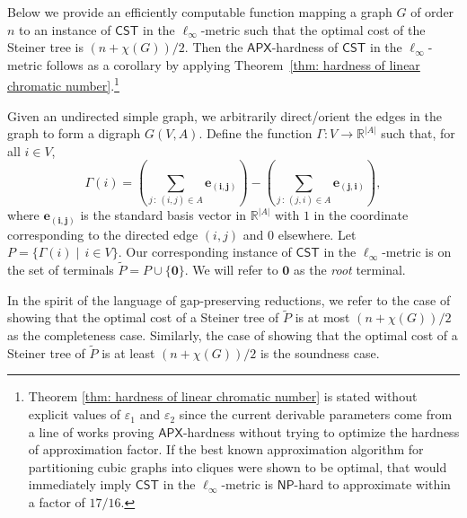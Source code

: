\documentclass{article}\providecommand{\DeclareRedundantLanguages}[2]{}\usepackage[a4paper,margin=20mm]{geometry}
\newcommand{\R}{\mathbb{R}}
\newcommand{\1}{\textbf{1}}
\newcommand{\cst}{$\mathsf{CST}$\xspace}
\newcommand{\np}{$\mathsf{NP}$\xspace}
\newcommand{\apx}{$\mathsf{APX}$\xspace}
\renewcommand{\tilde}{\widetilde}
\begin{document}
Below we provide an  efficiently computable function mapping a graph $G$ of order $n$ to an instance of \cst in the $\ell_{\infty}$-metric such that the optimal cost of the Steiner tree is $(n + \chi(G))/2$. Then the \apx-hardness of \cst in the $\ell_{\infty}$-metric follows as a corollary by applying Theorem~\ref{thm: hardness of linear chromatic number}.\footnote{Theorem \ref{thm: hardness of linear chromatic number} is stated without explicit values of $\varepsilon_1$ and $\varepsilon_2$ since the current derivable parameters come from a line of works proving \apx-hardness without trying to optimize the hardness of approximation factor. If the best known approximation algorithm for partitioning cubic graphs into cliques were shown to be optimal, that would immediately imply \cst in the $\ell_{\infty}$-metric is \np-hard to approximate within a factor of $17/16$.}


Given an undirected simple graph, we arbitrarily direct/orient the edges in the graph to form a digraph $G(V, A)$. Define the function $\Gamma: V \to \R^{|A|}$ such that, for all $i \in V$,
\[
\Gamma(i) = \left(\sum_{j \,:\, (i,j) \in A}\mathbf{e_{(i,j)}}\right) -\left( \sum_{j \,:\, (j,i)\in A}\mathbf{e_{(j,i)}}\right),
\]
where $\mathbf{e_{(i,j)}}$ is the standard basis vector in $\R^{|A|}$ with $1$ in the coordinate corresponding to the directed edge $(i,j)$ and $0$ elsewhere. Let $P = \{\Gamma(i) \mid\, i \in V\}$. Our corresponding instance of \cst in the $\ell_{\infty}$-metric is on the set of terminals $\tilde{P} =  P \cup \{\mathbf{0}\}$. We will refer to $\mathbf{0}$ as the \textit{root} terminal. 

In the spirit of the language of gap-preserving reductions, we refer to the case of showing that the optimal cost of a Steiner tree of $\tilde{P}$ is at most $(n + \chi(G))/2$ as the completeness case. Similarly, the case of showing that the optimal cost of a Steiner tree of $\tilde{P}$ is at least $(n + \chi(G))/2$ is the soundness case.
\end{document}
